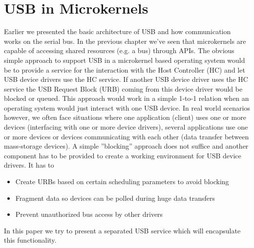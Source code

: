 \documentclass{acm_proc_article-sp}
\begin{document}
\section{USB in Microkernels}
\label{sec:both}
Earlier we presented the basic architecture of USB and how communication works on the serial bus.
In the previous chapter we've seen that microkernels are capable of accessing shared resources
(e.g. a bus) through APIs.
The obvious simple approach to support USB in a microkernel based operating system would be to provide
a service for the interaction with the Host Controller (HC) and let USB device drivers use the HC service.
If another USB device driver uses the HC service the USB Request Block (URB) coming from this device
driver would be blocked or queued.
This approach would work in a simple 1-to-1 relation when an operating system would just interact
with one USB device.
In real world scenarios however, we often face situations where one application (client) uses one or more
devices (interfacing with one or more device drivers), several applications use one or more devices or
devices communicating with each other (data transfer between mass-storage devices).
A simple ''blocking'' approach does not suffice and another component has to be provided to create a working
environment for USB device drivers.
It has to
\begin{itemize}
\item Create URBs based on certain scheduling parameters to avoid blocking
\item Fragment data so devices can be polled during huge data transfers
\item Prevent unauthorized bus access by other drivers
\end{itemize}
In this paper we try to present a separated USB service which will encapsulate this functionality.
\end{document}
